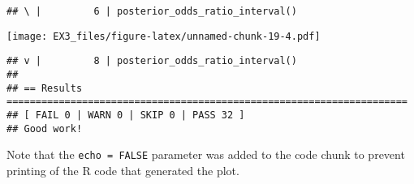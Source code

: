 \documentclass[
]{article}
\begin{document}
\begin{verbatim}
## \ |         6 | posterior_odds_ratio_interval()
\end{verbatim}

\texttt{[image: EX3\_files/figure-latex/unnamed-chunk-19-4.pdf]}

\begin{verbatim}
## v |         8 | posterior_odds_ratio_interval()
## 
## == Results =====================================================================
## [ FAIL 0 | WARN 0 | SKIP 0 | PASS 32 ]
## Good work!
\end{verbatim}

Note that the \texttt{echo\ =\ FALSE} parameter was added to the code
chunk to prevent printing of the R code that generated the plot.
\end{document}
